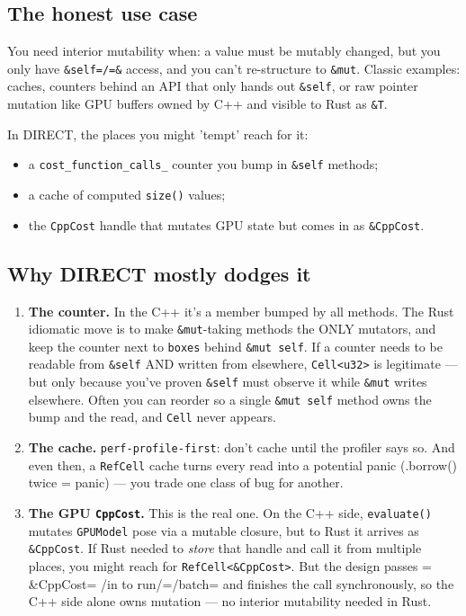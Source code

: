 \documentclass[11pt]{article}
\begin{document}
\subsection{The honest use case}
\label{sec:org103548a}

You need interior mutability when: a value must be mutably changed, but you
only have \texttt{\&self=/=\&} access, and you can't re-structure to \texttt{\&mut}. Classic
examples: caches, counters behind an API that only hands out \texttt{\&self}, or raw
pointer mutation like GPU buffers owned by C++ and visible to Rust as \texttt{\&T}.

In DIRECT, the places you might 'tempt' reach for it:

\begin{itemize}
\item a \texttt{cost\_function\_calls\_} counter you bump in \texttt{\&self} methods;
\item a cache of computed \texttt{size()} values;
\item the \texttt{CppCost} handle that mutates GPU state but comes in as \texttt{\&CppCost}.
\end{itemize}
\subsection{Why DIRECT mostly dodges it}
\label{sec:org307aab7}

\begin{enumerate}
\item \textbf{\textbf{The counter.}} In the C++ it's a member bumped by all methods. The Rust
idiomatic move is to make \texttt{\&mut}-taking methods the ONLY mutators, and keep
the counter next to \texttt{boxes} behind \texttt{\&mut self}. If a counter needs to be
readable from \texttt{\&self} AND written from elsewhere, \texttt{Cell<u32>} is legitimate
— but only because you've proven \texttt{\&self} must observe it while \texttt{\&mut}
writes elsewhere. Often you can reorder so a single \texttt{\&mut self} method owns
the bump and the read, and \texttt{Cell} never appears.
\item \textbf{\textbf{The cache.}} \texttt{perf-profile-first}: don't cache until the profiler says so.
And even then, a \texttt{RefCell} cache turns every read into a potential panic
(.borrow() twice = panic) — you trade one class of bug for another.
\item \textbf{\textbf{The GPU \texttt{CppCost}.}} This is the real one. On the C++ side, \texttt{evaluate()}
mutates \texttt{GPUModel} pose via a mutable closure, but to Rust it arrives as
\texttt{\&CppCost}. If Rust needed to \emph{store} that handle and call it from multiple
places, you might reach for \texttt{RefCell<\&CppCost>}. But the design passes =
\&CppCost= /in to run/=/batch= and finishes the call synchronously, so the
C++ side alone owns mutation — no interior mutability needed in Rust.
\end{enumerate}
\end{document}
